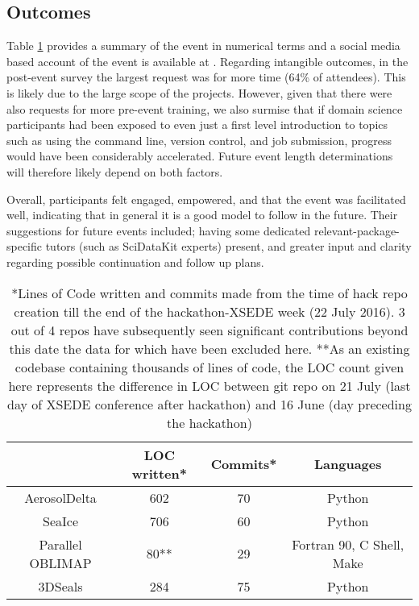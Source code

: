 \documentclass[conference]{IEEEtran}
\begin{document}
\subsection{Outcomes}
Table \ref{stats} provides a summary of the event in numerical terms and a social media based account of the event is available at \cite{noauthor_undated-az}.  Regarding intangible outcomes, in the post-event survey the largest request was for more time (64\% of attendees).  This is likely due to the large scope of the projects.  However, given that there were also requests for more pre-event training, we also surmise that if domain science participants had been exposed to even just a first level introduction to topics such as using the command line, version control, and job submission, progress would have been considerably accelerated.  Future event length determinations will therefore likely depend on both factors.

Overall, participants felt engaged, empowered, and that the event was facilitated well, indicating that in general it is a good model to follow in the future.  Their suggestions for future events included; having some dedicated relevant-package-specific tutors (such as SciDataKit experts) present, and greater input and clarity regarding possible continuation and follow up plans.




\begin{table}[!t]\label{stats}
\centering
\renewcommand{\arraystretch}{1.3}
\begin{tabular}{|c|c|c|c|}
\hline
&LOC written* & Commits* & Languages\\
\hline
AerosolDelta & 602 & 70 & Python\\
\hline
SeaIce & 706 & 60 & Python\\
\hline
Parallel OBLIMAP & 80** & 29 & Fortran 90, C Shell, Make\\
\hline
3DSeals & 284 & 75 & Python\\
\hline
\end{tabular}
\caption{*Lines of Code written and commits made from the time of hack repo creation till the end of the hackathon-XSEDE week (22 July 2016).  3 out of 4 repos have subsequently seen significant contributions beyond this date the data for which have been excluded here.
**As an existing codebase containing thousands of lines of code, the LOC count given here represents the difference in LOC between git repo on 21 July (last day of XSEDE conference after hackathon) and 16 June (day preceding the hackathon)}
\end{table}
\end{document}
